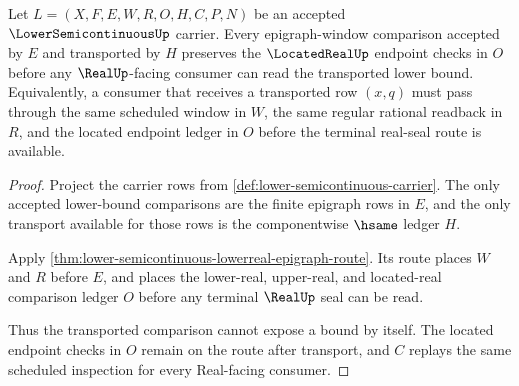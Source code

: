 \begin{theorem}
\label{thm:lower-semicontinuous-located-readback-stability}
Let $L=(X,F,E,W,R,O,H,C,P,N)$ be an accepted
$\LowerSemicontinuousUp$ carrier. Every epigraph-window comparison accepted by
$E$ and transported by $H$ preserves the $\LocatedRealUp$ endpoint checks in
$O$ before any $\RealUp$-facing consumer can read the transported lower bound.
Equivalently, a consumer that receives a transported row $(x,q)$ must pass
through the same scheduled window in $W$, the same regular rational readback in
$R$, and the located endpoint ledger in $O$ before the terminal real-seal route
is available.
\end{theorem}
\begin{proof}
Project the carrier rows from \autoref{def:lower-semicontinuous-carrier}. The
only accepted lower-bound comparisons are the finite epigraph rows in $E$, and
the only transport available for those rows is the componentwise $\hsame$
ledger $H$.

Apply \autoref{thm:lower-semicontinuous-lowerreal-epigraph-route}. Its route
places $W$ and $R$ before $E$, and places the lower-real, upper-real, and
located-real comparison ledger $O$ before any terminal $\RealUp$ seal can be
read.

Thus the transported comparison cannot expose a bound by itself. The located
endpoint checks in $O$ remain on the route after transport, and $C$ replays the
same scheduled inspection for every Real-facing consumer.
\end{proof}

